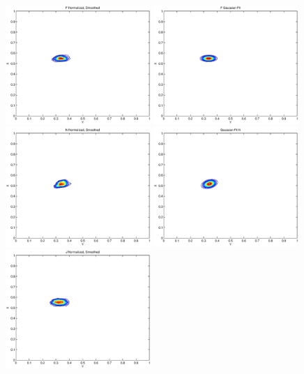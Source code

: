 \begin{figure}[h!]
  \centering
    \includegraphics[width=0.49\textwidth]{Chapter3/Figs/FHands_XY_fBin.eps}
    \includegraphics[width=0.49\textwidth]{Chapter3/Figs/FHands_XY_gFit.eps}
    \includegraphics[width=0.49\textwidth]{Chapter3/Figs/NHands_XY_fBin.eps}
    \includegraphics[width=0.49\textwidth]{Chapter3/Figs/NHands_XY_gFit.eps}
    \includegraphics[width=0.49\textwidth]{Chapter3/Figs/JHands_XY_fBin.eps}

\end{figure}
